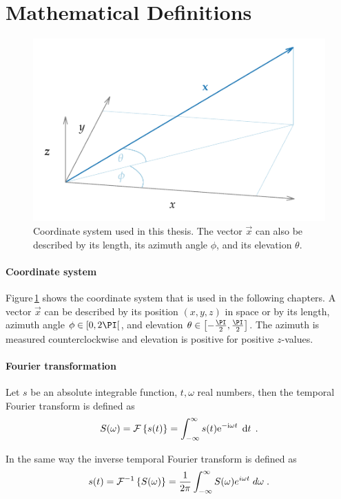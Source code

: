 \section{Mathematical Definitions}
\label{sec:mathematical_definitions}
%
\begin{figure}
    \centering
    \includegraphics{fig1_05/fig1_05}
    \caption{Coordinate system used in this thesis. The vector $\vec{x}$ can also
    be described by its length, its azimuth angle $\phi$, and its elevation
    $\theta$.
    }
    \label{fig:coordinate_system}
\end{figure}
%
\paragraph{Coordinate system}
Figure\,\ref{fig:coordinate_system} shows the coordinate system that is used in
the following chapters. A vector $\vec{x}$ can be described by its position
$(x,y,z)$ in space or by its length, azimuth angle $\phi \in [0,2\PI[$,
and elevation $\theta \in \left[-\frac{\PI}{2},\frac{\PI}{2}\right]$.
The azimuth is measured counterclockwise and elevation is positive
for positive $z$-values.


\paragraph{Fourier transformation}
Let $s$ be an absolute integrable function, $t,\omega$ real numbers, then the
temporal Fourier transform is defined as\autocite{Bracewell2000}
%
\begin{equation}
    S(\omega) = \FT{s(t)} = \int^{\infty}_{-\infty} s(t) \E^{-\I\omega t}
    \; \df{t}
    \qp
    \label{eq:ft}
\end{equation}

In the same way the inverse temporal Fourier transform is defined as
%
\begin{equation}
    s(t) = \IFT{S(\omega)} = \frac{1}{2\pi} \int^{\infty}_{-\infty} S(\omega)
    e^{i\omega t} \; d\omega
    \qp
    \label{eq:ift}
\end{equation}
